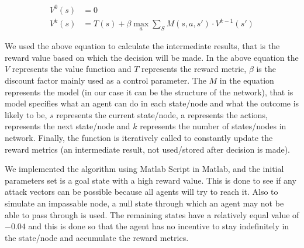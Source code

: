 \begin{equation} 
    \label{eq:infinite_horizon}
    \begin{aligned}
    V^0(s) &= 0 \\
    V^k(s) &= T(s) + \beta \max_a \sum_S M(s,a,s') \cdot V^{k-1}(s')
    \end{aligned}
\end{equation}


We used the above equation to calculate the intermediate results, that is the
reward value based on which the decision will be made. In the above equation the
\( V \) represents the value function and \( T \) represents the reward metric, $\beta$ is the
discount factor mainly used as a control parameter. The \(M\) in the equation
represents the model (in our case it can be the structure of the network), that
is model specifies what an agent can do in each state/node and what the outcome
is likely to be, \(s\) represents the current state/node, a represents the actions,
represents the next state/node and \(k\) represents the number of states/nodes in
network. Finally, the function is iteratively called to constantly update the reward
metrics (an intermediate result, not used/stored after decision is made).

We implemented the algorithm using Matlab Script in Matlab, and the
initial parameters set is a goal state with a high
reward value. This is done to see if any attack vectors can be possible because
all agents will try to reach it. Also to simulate an impassable node, a null
state through which an agent may not be able to pass through is used. The
remaining states have a relatively equal value of \(-0.04\) and this is done so that the agent
has no incentive to stay indefinitely in the state/node and accumulate the
reward metrics.
 
